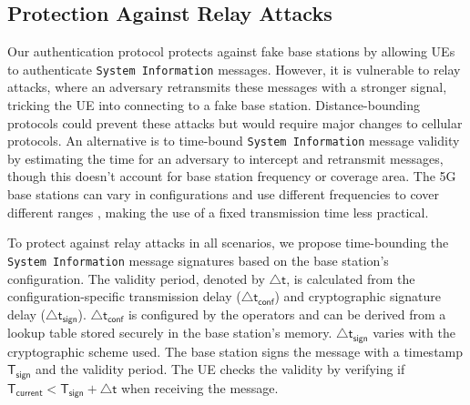 \subsection{Protection Against Relay Attacks}
Our authentication protocol protects against fake base stations by allowing UEs to authenticate \texttt{System Information} messages. However, it is vulnerable to relay attacks, where an adversary retransmits these messages with a stronger signal, tricking the UE into connecting to a fake base station. Distance-bounding protocols \cite{rasmussen2010realization, tippenhauer2015uwb, durholz2011formal} could prevent these attacks but would require major changes to cellular protocols. An alternative is to time-bound \texttt{System Information} message validity by estimating the time for an adversary to intercept and retransmit messages, though this doesn't account for base station frequency or coverage area. The 5G base stations can vary in configurations and use different frequencies to cover different ranges \cite{3GPP:38.104}, making the use of a fixed transmission time less practical. 

To protect against relay attacks in all scenarios, we propose time-bounding the \texttt{System Information} message signatures based on the base station’s configuration. The validity period, denoted by $\mathsf{\bigtriangleup t}$, is calculated from the configuration-specific transmission delay ($\mathsf{\bigtriangleup t_{conf}}$) and cryptographic signature delay ($\mathsf{\bigtriangleup t_{sign}}$). $\mathsf{\bigtriangleup t_{conf}}$ is configured by the operators and can be derived from a lookup table stored securely in the base station's memory. $\mathsf{\bigtriangleup t_{sign}}$ varies with the cryptographic scheme used. The base station signs the message with a timestamp $\mathsf{T_{sign}}$ and the validity period. The UE checks the validity by verifying if $\mathsf{T_{current} < T_{sign} + \bigtriangleup t}$ when receiving the message.
